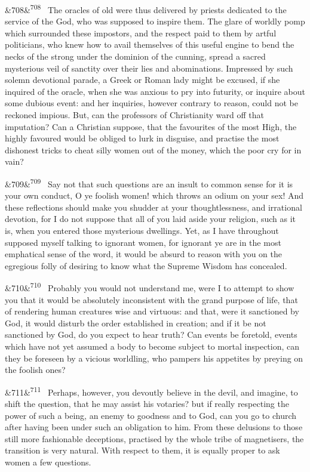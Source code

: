 \documentclass[12pt]{article}
\newcommand{\para}[1][]{\par\noindent\ifx&#1&\else\textsuperscript{\footnotesize #1}~\fi}
\begin{document}
\para[708] The oracles of old were thus delivered by priests dedicated to the service of the God, who was supposed to inspire them. The glare of worldly pomp which surrounded these impostors, and the respect paid to them by artful politicians, who knew how to avail themselves of this useful engine to bend the necks of the strong under the dominion of the cunning, spread a sacred mysterious veil of sanctity over their lies and abominations. Impressed by such solemn devotional parade, a Greek or Roman lady might be excused, if she inquired of the oracle, when she was anxious to pry into futurity, or inquire about some dubious event: and her inquiries, however contrary to reason, could not be reckoned impious. But, can the professors of Christianity ward off that imputation? Can a Christian suppose, that the favourites of the most High, the highly favoured would be obliged to lurk in disguise, and practise the most dishonest tricks to cheat silly women out of the money, which the poor cry for in vain?

\para[709] Say not that such questions are an insult to common sense for it is your own conduct, O ye foolish women! which throws an odium on your sex! And these reflections should make you shudder at your thoughtlessness, and irrational devotion, for I do not suppose that all of you laid aside your religion, such as it is, when you entered those mysterious dwellings. Yet, as I have throughout supposed myself talking to ignorant women, for ignorant ye are in the most emphatical sense of the word, it would be absurd to reason with you on the egregious folly of desiring to know what the Supreme Wisdom has concealed.

\para[710] Probably you would not understand me, were I to attempt to show you that it would be absolutely inconsistent with the grand purpose of life, that of rendering human creatures wise and virtuous: and that, were it sanctioned by God, it would disturb the order established in creation; and if it be not sanctioned by God, do you expect to hear truth? Can events be foretold, events which have not yet assumed a body to become subject to mortal inspection, can they be foreseen by a vicious worldling, who pampers his appetites by preying on the foolish ones?

\para[711] Perhaps, however, you devoutly believe in the devil, and imagine, to shift the question, that he may assist his votaries? but if really respecting the power of such a being, an enemy to goodness and to God, can you go to church after having been under such an obligation to him. From these delusions to those still more fashionable deceptions, practised by the whole tribe of magnetisers, the transition is very natural. With respect to them, it is equally proper to ask women a few questions.
\end{document}
